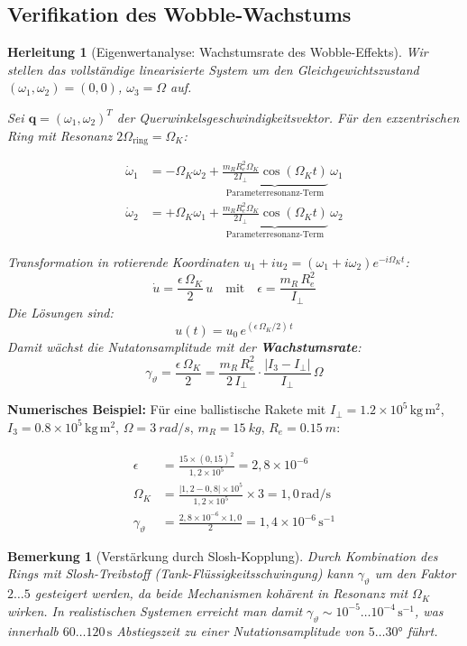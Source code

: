 ﻿\documentclass[12pt,a4paper]{article}
\newtheorem{herleitung}{Herleitung}[section]
\newtheorem{bemerkung}{Bemerkung}[section]
\newcommand{\vek}[1]{\boldsymbol{#1}}
\begin{document}
\subsection{Verifikation des Wobble-Wachstums}

\begin{herleitung}[Eigenwertanalyse: Wachstumsrate des Wobble-Effekts]
Wir stellen das vollständige linearisierte System um den Gleichgewichtszustand
$(\omega_1, \omega_2) = (0,0)$, $\omega_3 = \Omega$ auf.

Sei $\vek{q} = (\omega_1, \omega_2)^T$ der Querwinkelsgeschwindigkeitsvektor.
Für den exzentrischen Ring mit Resonanz $2\Omega_{\mathrm{ring}} = \Omega_K$:

\begin{align*}
  \dot{\omega}_1 &= -\Omega_K\omega_2 + \underbrace{\frac{m_R R_e^2 \Omega_K}{2 I_\perp}
    \cos(\Omega_K t)}_{\text{Parameterresonanz-Term}}\,\omega_1\\
  \dot{\omega}_2 &= +\Omega_K\omega_1 + \underbrace{\frac{m_R R_e^2 \Omega_K}{2 I_\perp}
    \cos(\Omega_K t)}_{\text{Parameterresonanz-Term}}\,\omega_2
\end{align*}

Transformation in rotierende Koordinaten $u_1 + iu_2 = (\omega_1+i\omega_2)e^{-i\Omega_K t}$:
\[
  \dot{u} = \frac{\epsilon\,\Omega_K}{2}\,u \quad\text{mit}\quad
  \epsilon = \frac{m_R\,R_e^2}{I_\perp}
\]
Die Lösungen sind:
\[
  u(t) = u_0\,e^{(\epsilon\,\Omega_K/2)\,t}
\]
Damit wächst die Nutatonsamplitude mit der \textbf{Wachstumsrate}:
\[
  \boxed{\gamma_\vartheta = \frac{\epsilon\,\Omega_K}{2}
    = \frac{m_R\,R_e^2}{2\,I_\perp}\cdot\frac{|I_3-I_\perp|}{I_\perp}\,\Omega}
\]
\end{herleitung}

\textbf{Numerisches Beispiel:} Für eine ballistische Rakete mit
$I_\perp = 1.2\times10^5\,\mathrm{kg\,m^2}$,
$I_3 = 0.8\times10^5\,\mathrm{kg\,m^2}$,
$\Omega = \SI{3}{rad/s}$, $m_R = \SI{15}{kg}$, $R_e = \SI{0.15}{m}$:

\begin{align*}
  \epsilon   &= \frac{15 \times (0{,}15)^2}{1{,}2\times10^5} = 2{,}8\times10^{-6}\\
  \Omega_K   &= \frac{|1{,}2-0{,}8|\times10^5}{1{,}2\times10^5}\times 3
               = 1{,}0\,\mathrm{rad/s}\\
  \gamma_\vartheta &= \frac{2{,}8\times10^{-6}\times1{,}0}{2} = 1{,}4\times10^{-6}\,\mathrm{s}^{-1}
\end{align*}

\begin{bemerkung}[Verstärkung durch Slosh-Kopplung]
Durch Kombination des Rings mit Slosh-Treibstoff (Tank-Flüssigkeitsschwingung)
kann $\gamma_\vartheta$ um den Faktor $2\ldots5$ gesteigert werden,
da beide Mechanismen kohärent in Resonanz mit $\Omega_K$ wirken.
In realistischen Systemen erreicht man damit
$\gamma_\vartheta \sim 10^{-5}\ldots10^{-4}\,\mathrm{s}^{-1}$,
was innerhalb $60\ldots120\,\mathrm{s}$ Abstiegszeit
zu einer Nutationsamplitude von $5\ldots 30 °$ führt.
\end{bemerkung}
\end{document}
